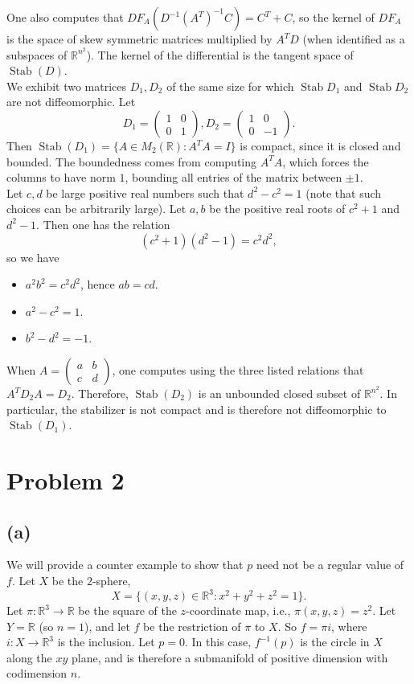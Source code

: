 \documentclass{amsbook}
\theoremstyle{theorem}
\theoremstyle{plain}
\theoremstyle{remark}
\newcommand{\R}{\mathbb R}
\newcommand{\stab}{\operatorname{Stab}}
\begin{document}
One also computes that $DF_A(D^{-1}(A^T)^{-1}C) = C^T + C$, so the kernel of $DF_A$ is the space of skew symmetric matrices multiplied by $A^TD$ (when identified as a subspaces of $\R^{n^2}$). The kernel of the differential is the tangent space of $\stab (D)$. \\

We exhibit two matrices $D_1, D_2 $ of the same size for which $\stab D_1$ and $\stab D_2$ are not diffeomorphic. Let \[D_1 =
  \begin{pmatrix}
    1& 0\\ 0& 1
  \end{pmatrix}, D_2 =
  \begin{pmatrix}
    1& 0 \\ 0 & -1
  \end{pmatrix}.\]
Then $\stab(D_1) = \{A\in M_2(\R): A^TA = I\}$ is compact, since it is closed and bounded. The boundedness comes from computing $A^TA$, which forces the columns to have norm $1$, bounding all entries of the matrix between $\pm 1$.\\

Let $c,d$ be large positive real numbers such that $d^2 - c^2 = 1$ (note that such choices can be arbitrarily large). Let $a,b$ be the positive real roots of $c^2+1$ and $d^2 - 1$. Then one has the relation \[(c^2 + 1)(d^2 - 1) = c^2d^2,\] so we have
\begin{itemize}
\item $a^2b^2 = c^2d^2$, hence $ab = cd$.
\item $a^2-c^2 = 1$.
\item $b^2 - d^2 = -1$.
\end{itemize}
When $A =
\begin{pmatrix}
  a&b\\c&d
\end{pmatrix}$, one computes using the three listed relations that $A^TD_2A = D_2$. Therefore, $\stab (D_2)$ is an unbounded closed subset of $\R^{n^2}$. In particular, the stabilizer is not compact and is therefore not diffeomorphic to $\stab(D_1)$.
\chapter*{Problem 2}
\section*{(a)}
We will provide a counter example to show that $p$ need not be a regular value of $f$. Let $X$ be the $2$-sphere, \[X = \{(x,y,z) \in \R^3 : x^2 + y^2 + z^2 = 1 \}.\] Let $\pi: \R^3 \to \R$ be the square of the $z$-coordinate map, i.e., $\pi(x,y,z) = z^2$. Let $Y = \R$ (so $n = 1$), and let $f$ be the restriction of $\pi$ to $X$. So $f = \pi i$, where $i:X\to \R^3$ is the inclusion. Let $p = 0$. In this case, $f^{-1}(p)$ is the circle in $X$ along the $xy$ plane, and is therefore a submanifold of positive dimension with codimension $n$. 
\end{document}

